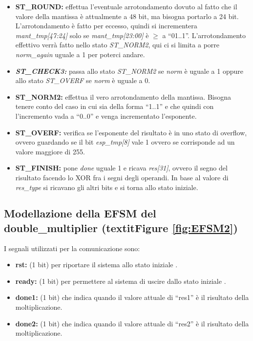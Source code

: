 \documentclass[]{IEEEtran}
\begin{document}
\begin{itemize}
    \item \textbf{ST\_ROUND:} effettua l'eventuale arrotondamento dovuto al fatto che il valore della mantissa è attualmente a 48 bit, ma bisogna portarlo a 24 bit. L'arrotondamento è fatto per eccesso, quindi si incrementera \textit{mant\_tmp[47:24]} solo se \textit{mant\_tmp[23:00]} è $\geq$ a ``01..1''. L'arrotondamento effettivo verrà fatto nello stato \textit{ST\_NORM2}, qui ci si limita a porre \textit{norm\_again} uguale a 1 per poterci andare.
    \item \textit{\textbf{ST\_CHECK3:}} passa allo stato \textit{ST\_NORM2} se \textit{norm} è uguale a 1 oppure allo stato \textit{ST\_OVERF} se \textit{norm} è uguale a 0.
    \item \textbf{ST\_NORM2:} effettua il vero arrotondamento della mantissa. Bisogna tenere conto del caso in cui sia della forma ``1..1'' e che quindi con l'incremento vada a ``0..0'' e  venga incrementato l'esponente.
    \item \textbf{ST\_OVERF:} verifica se l'esponente del risultato è in uno stato di overflow, ovvero guardando se il bit \textit{esp\_tmp[8]} vale 1 ovvero se corrisponde ad un valore maggiore di 255.
    \item \textbf{ST\_FINISH:} pone \textit{done} uguale 1 e ricava \textit{res[31]}, ovvero il segno del risultato facendo lo XOR fra i segni degli operandi. In base al valore di \textit{res\_type} si ricavano gli altri bits e si torna allo stato iniziale.
\end{itemize}


\subsection{Modellazione della EFSM del double\_multiplier (textit{Figure \ref{fig:EFSM2}})}
I segnali utilizzati per la comunicazione sono:
\begin{itemize}
    \item \textbf{rst:} (1 bit) per riportare il sistema allo stato iniziale .
    \item \textbf{ready:} (1 bit) per permettere al sistema di uscire dallo stato iniziale .
    \item \textbf{done1:} (1 bit) che indica quando il valore attuale di ``res1'' è il risultato della moltiplicazione.
    \item \textbf{done2:} (1 bit) che indica quando il valore attuale di ``res2'' è il risultato della moltiplicazione.
\end{itemize}
\end{document}
